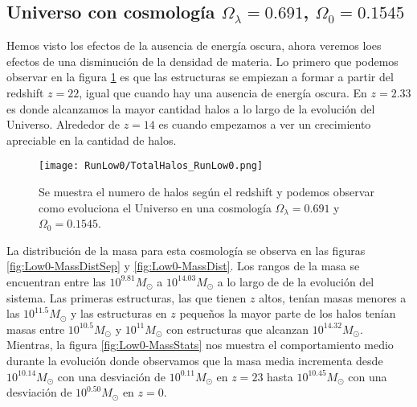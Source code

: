 
\subsection{Universo con cosmología \texorpdfstring{$\Omega_\lambda = 0.691$, $\Omega_0 = 0.1545$ }{Omega lambda = 0.691, Omega 0 = 0.1545}  }

Hemos visto los efectos de la ausencia de energía oscura, ahora veremos loes efectos de una disminución de la densidad de materia. Lo primero que podemos observar en la figura \ref{fig:Low0_TotalHalos} es que las estructuras se empiezan a formar a partir del redshift $z=22$, igual que cuando  hay una ausencia de energía oscura. En $z= 2.33$ es donde alcanzamos la mayor cantidad halos a lo largo de la evolución del Universo. Alrededor de $z = 14$ es cuando empezamos a ver un crecimiento apreciable en la cantidad de halos.

\begin{figure}[H]
    \centering
    \texttt{[image: RunLow0/TotalHalos\_RunLow0.png]}
    \caption[Evolución del número de halos en un Universo $\Omega_\lambda = 0.691$, $\Omega_0 = 0.1545$]{\footnotesize Se muestra el numero de halos según el redshift y podemos observar como evoluciona el Universo en una cosmología $\Omega_\lambda = 0.691 $ y $\Omega_0 = 0.1545$.}
    \label{fig:Low0_TotalHalos}
\end{figure}

La distribución de la masa para esta cosmología se observa en las figuras \ref{fig:Low0-MassDistSep} y \ref{fig:Low0-MassDist}. Los rangos de la masa se encuentran entre las $10^{9.81}M_\odot$ a $10^{14.03}M_\odot$ a lo largo de de la evolución del sistema. Las primeras estructuras, las que tienen $z$ altos, tenían masas menores a las $10^{11.5}M_\odot$ y las estructuras en $z$ pequeños la mayor parte de los halos tenían masas entre $10^{10.5}M_\odot$ y $10^{11}M_\odot$ con estructuras que alcanzan $10^{14.32}M_\odot$. Mientras, la figura \ref{fig:Low0-MassStats} nos muestra el comportamiento medio durante la evolución donde observamos que la masa media incrementa desde $10^{10.14}M_\odot$ con una desviación de $10^{0.11}M_\odot$ en $z=23$ hasta $10^{10.45}M_\odot$ con una desviación de $10^{0.50}M_\odot$ en $z=0$.

